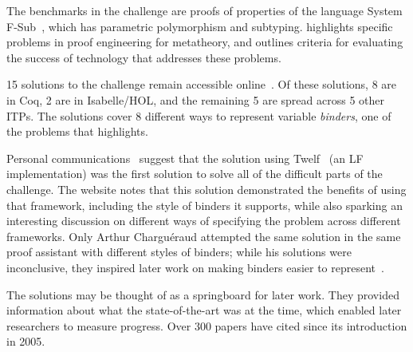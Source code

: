 The benchmarks in the \poplmark challenge are proofs of properties of
the language System F-Sub~\citep{Cardelli1994}, which has parametric polymorphism and
subtyping. \poplmark highlights specific problems in
proof engineering for metatheory, %
and outlines criteria for evaluating the success of technology that
addresses these problems.



15 solutions to the \poplmark challenge remain accessible online~\citep{poplmark-website}. 
Of these solutions, 8 are in Coq, 2 are in Isabelle/HOL,
and the remaining 5 are spread across 5 other ITPs. The solutions cover 8 different ways to represent variable \textit{binders},
one of the problems that \poplmark highlights.

Personal communications~\citep{harpersonal, piercenal2}
suggest that the solution using Twelf~\citep{Pfenning1999} (an LF implementation) was the first solution to solve
all of the difficult parts of the challenge.
The website notes that this solution demonstrated the benefits
of using that framework, including the style of binders it supports, while also sparking an interesting discussion
on different ways of specifying the problem across different frameworks.
Only Arthur Chargu{\'e}raud attempted the same solution in the same proof assistant with different styles of binders;
while his solutions were inconclusive, they inspired later work on making binders easier to represent~\citep{Aydemir2008, Chargueraud2011}.

The \poplmark solutions may be thought of as a springboard for later work. They provided information about what
the state-of-the-art was at the time, which enabled later researchers to measure progress.
Over 300 papers have cited \poplmark since its introduction in 2005.

